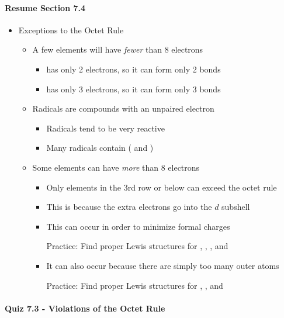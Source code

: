 \documentclass[12pt, openany, letterpaper]{memoir}
\begin{document}
\paragraph*{Resume Section 7.4}
\begin{itemize}
  \item Exceptions to the Octet Rule
    \begin{itemize}
      \item A few elements will have \emph{fewer} than 8 electrons
            \begin{itemize}
              \item {} has only 2 electrons, so it can form only 2 bonds
              \item {} has only 3 electrons, so it can form only 3 bonds
            \end{itemize}
      \item Radicals are compounds with an unpaired electron
            \begin{itemize}
              \item Radicals tend to be very reactive
              \item Many radicals contain  ( and )
            \end{itemize}
      \item Some elements can have \emph{more} than 8 electrons
            \begin{itemize}
              \item Only elements in the 3rd row or below can exceed the octet rule
              \item This is because the extra electrons go into the $d$ subshell
              \item This can occur in order to minimize formal charges

                    Practice: Find proper Lewis structures for , , , and 
              \item It can also occur because there are simply too many outer atoms

                    Practice: Find proper Lewis structures for , , and 
            \end{itemize}
    \end{itemize}
\end{itemize}

\paragraph*{Quiz 7.3 - Violations of the Octet Rule}
\end{document}
